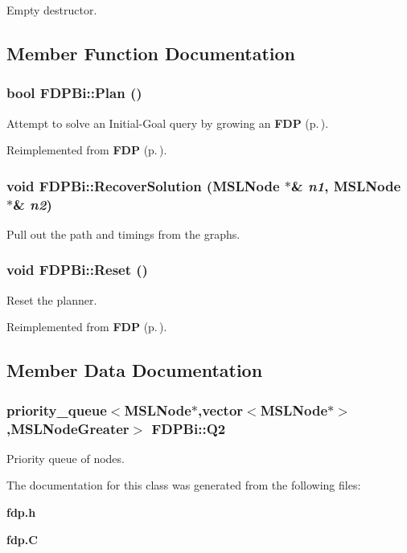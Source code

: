 Empty destructor.



\subsection{Member Function Documentation}
\subsubsection{\setlength{\rightskip}{0pt plus 5cm}bool FDPBi::Plan ()\hspace{0.3cm}{\tt  [virtual]}}\label{classFDPBi_a3}


Attempt to solve an Initial-Goal query by growing an {\bf FDP} {\rm (p.\,\pageref{classFDP})}.



Reimplemented from {\bf FDP} {\rm (p.\,\pageref{classFDP_a3})}.
\subsubsection{\setlength{\rightskip}{0pt plus 5cm}void FDPBi::Recover\-Solution ({\bf MSLNode} $\ast$\& {\em n1}, {\bf MSLNode} $\ast$\& {\em n2})\hspace{0.3cm}{\tt  [protected]}}\label{classFDPBi_b0}


Pull out the path and timings from the graphs.

\subsubsection{\setlength{\rightskip}{0pt plus 5cm}void FDPBi::Reset ()\hspace{0.3cm}{\tt  [virtual]}}\label{classFDPBi_a2}


Reset the planner.



Reimplemented from {\bf FDP} {\rm (p.\,\pageref{classFDP_a2})}.

\subsection{Member Data Documentation}
\subsubsection{\setlength{\rightskip}{0pt plus 5cm}priority\_\-queue$<${\bf MSLNode}$\ast$,vector$<${\bf MSLNode}$\ast$$>$,{\bf MSLNode\-Greater}$>$ FDPBi::Q2\hspace{0.3cm}{\tt  [protected]}}\label{classFDPBi_n0}


Priority queue of nodes.



The documentation for this class was generated from the following files:\begin{CompactItemize}
\item 
{\bf fdp.h}\item 
{\bf fdp.C}\end{CompactItemize}
